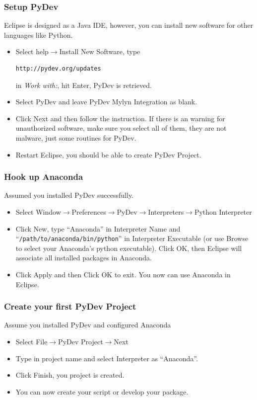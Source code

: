 \documentclass{beamer}
\begin{document}
\begin{frame}[fragile]
\frametitle{Setup PyDev}

Eclipse is designed as a Java IDE, however, you can install new software for other languages like Python.

\begin{itemize}
\item[\ding{43}] Select help$\rightarrow$Install New Software, type
\begin{verbatim}
http://pydev.org/updates
\end{verbatim}
in \emph{Work with:}, hit Enter, PyDev is retrieved.
\item[\ding{43}] Select PyDev and leave PyDev Mylyn Integration as blank.
\item[\ding{43}] Click Next and then follow the instruction. If there is an warning for unauthorized software, make sure you select all of them, they are not malware, just some routines for PyDev.
\item[\ding{43}] Restart Eclipse, you should be able to create PyDev Project.
\end{itemize}

\end{frame}

\begin{frame}[fragile]
\frametitle{Hook up Anaconda}

Assumed you installed PyDev successfully.
\begin{itemize}
  \item[\ding{43}] Select Window$\rightarrow$Preferences$\rightarrow$PyDev$\rightarrow$Interpreters$\rightarrow$Python Interpreter
  \item[\ding{43}] Click New, type ``Anaconda'' in Interpreter Name and ``\texttt{/path/to/anaconda/bin/python}'' in Interpreter Executable (or use Browse to select your Anaconda's python executable). Click OK, then Eclipse will associate all installed packages in Anaconda.
  \item[\ding{43}] Click Apply and then Click OK to exit. You now can use Anaconda in Eclipse.
\end{itemize}

\end{frame}

\begin{frame}[fragile]
\frametitle{Create your first PyDev Project}

Assume you installed PyDev and configured Anaconda
\begin{itemize}
\item[\ding{43}] Select File$\rightarrow$PyDev Project$\rightarrow$Next
\item[\ding{43}] Type in project name and select Interpreter as ``Anaconda''.
\item[\ding{43}] Click Finish, you project is created.
\item[\ding{43}] You can now create your script or develop your package.
\end{itemize}

\end{frame}
\end{document}
